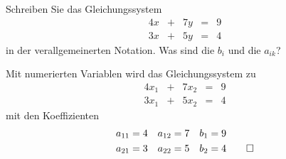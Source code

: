 Schreiben Sie das Gleichungssystem
\begin{equation*}
\renewcommand{\arraycolsep}{3pt}
\begin{array}{rcrcr}
4x &+& 7y &=& 9 \\
3x &+& 5y &=& 4
\end{array}
\end{equation*}
in der verallgemeinerten Notation.
Was sind die $b_i$ und die $a_{ik}$?

\begin{loesung}
Mit numerierten Variablen wird das Gleichungssystem zu
\begin{equation*}
\begin{array}{rcrcr}
4x_1 &+& 7x_2 &=& 9 \\
3x_1 &+& 5x_2 &=& 4
\end{array}
\end{equation*}
mit den Koeffizienten
\begin{align*}
a_{11} &= 4 & a_{12} &= 7 & b_1 &= 9 \\
a_{21} &= 3 & a_{22} &= 5 & b_2 &= 4
\qedhere
\end{align*}
\end{loesung}

